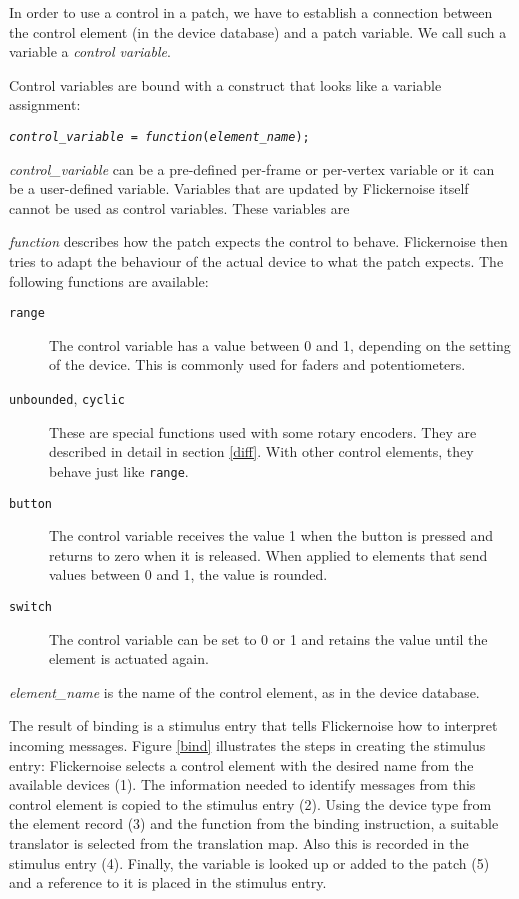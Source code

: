 \documentclass[11pt,a4paper]{article}
\newenvironment{expose}{\vskip3mm\qquad\begin{raggedright}}{%
\end{raggedright}\vskip3mm}
\begin{document}
In order to use a control in a patch, we have to establish a connection
between the control element (in the device database) and a patch
variable. We call such a variable a {\em control variable}.

Control variables are bound with a construct that looks like a
variable assignment:

\begin{expose}
{\tt {\em control\_variable} = {\em function}({\em element\_name});}
\end{expose}

{\em control\_variable} can be a pre-defined per-frame or per-vertex
variable or it can be a user-defined variable. Variables that are
updated by Flickernoise itself cannot be used as control variables.
These variables are


{\em function} describes how the patch expects the control to behave.
Flickernoise then tries to adapt the behaviour of the actual device
to what the patch expects. The following functions are available:

\begin{description}
  \item[\tt range]
    The control variable has a value between 0 and 1, depending on the
    setting of the device. This is commonly used for faders and
    potentiometers.
  \item[{\tt unbounded}, {\tt cyclic}]
    These are special functions used with some rotary encoders. They
    are described in detail in section \ref{diff}. With other control
    elements, they behave just like {\tt range}.
  \item[\tt button]
    The control variable receives the value 1 when the button is
    pressed and returns to zero when it is released. When applied to
    elements that send values between 0 and 1, the value is rounded.
  \item[\tt switch]
    The control variable can be set to 0 or 1 and retains the value
    until the element is actuated again.
\end{description}

{\em element\_name} is the name of the control element, as in the
device database.

The result of binding is a stimulus entry that tells Flickernoise
how to interpret incoming messages.
Figure \ref{bind} illustrates the steps in creating the stimulus
entry: Flickernoise
selects a control element with the desired name from the available
devices (1). The information needed to identify messages from this
control element is copied to the stimulus entry (2). Using the
device type from the element record (3) and the function from the
binding instruction, a suitable translator is selected from the
translation map. Also this is recorded in the stimulus entry (4).
Finally, the variable is looked up or added to the patch (5) and
a reference to it is placed in the stimulus entry.
\end{document}

